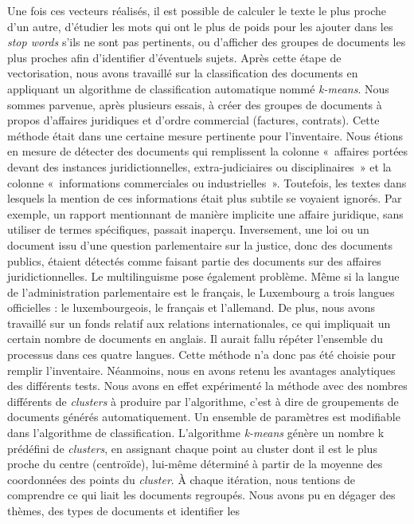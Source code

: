 Une fois ces vecteurs réalisés, il est possible de calculer le texte
le plus proche d'un autre, d'étudier les mots qui ont le plus de
poids pour les ajouter dans les \emph{stop words} s'ils ne sont pas pertinents,
ou d'afficher des groupes de documents les plus proches afin
d'identifier d'éventuels sujets. Après cette étape de vectorisation,
nous avons travaillé sur la classification des documents en appliquant
un algorithme de classification automatique nommé \emph{k-means}. Nous
sommes parvenue, après plusieurs essais, à créer des groupes de
documents à propos d'affaires juridiques et d'ordre commercial
(factures, contrats). Cette méthode était dans une certaine mesure
pertinente pour l'inventaire. Nous étions en mesure de détecter des
documents qui remplissent la colonne «~affaires portées devant des
instances juridictionnelles, extra-judiciaires ou disciplinaires~» et la
colonne «~informations commerciales ou industrielles~». Toutefois, les
textes dans lesquels la mention de ces informations était plus subtile se voyaient
ignorés. Par exemple, un rapport mentionnant de manière implicite une
affaire juridique, sans utiliser de termes spécifiques, passait
inaperçu. Inversement, une loi ou un document issu d'une question
parlementaire sur la justice, donc des documents publics, étaient
détectés comme faisant partie des documents sur des affaires
juridictionnelles. Le multilinguisme pose également problème. Même si la
langue de l'administration parlementaire est le français, le Luxembourg
a trois langues officielles : le luxembourgeois, le français et
l'allemand. De plus, nous avons travaillé sur un fonds relatif aux
relations internationales, ce qui impliquait un certain nombre de
documents en anglais. Il aurait fallu répéter l'ensemble du
processus dans ces quatre langues. Cette méthode n'a donc pas été
choisie pour remplir l'inventaire. Néanmoins, nous en avons retenu les
avantages analytiques des différents tests. Nous avons en effet
expérimenté la méthode avec des nombres différents de \emph{clusters} à
produire par l'algorithme, c'est à dire de groupements de documents
générés automatiquement. Un ensemble de paramètres est modifiable dans
l'algorithme de classification. L'algorithme
\emph{k-means} génère un nombre k
prédéfini de \emph{clusters}, en assignant chaque point au cluster dont il est
le plus proche du centre (centroïde), lui-même déterminé à partir de la
moyenne des coordonnées des points du \emph{cluster}. À chaque itération, nous
tentions de comprendre ce qui liait les documents regroupés. Nous avons
pu en dégager des thèmes, des types de documents et identifier les
